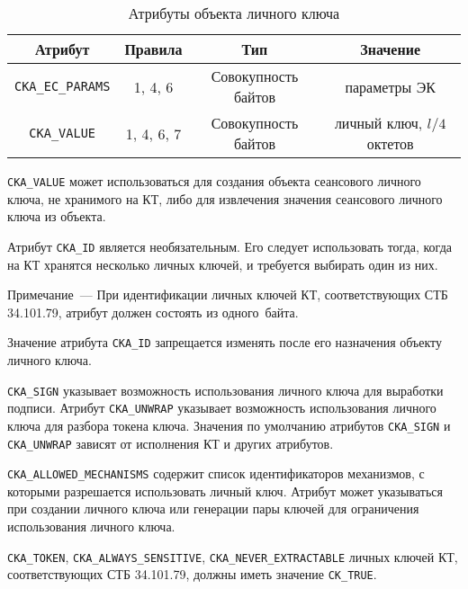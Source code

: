 \begin{table}[H]
\caption{Атрибуты объекта личного ключа}\label{Table.CRYPTOKI.EcPrivkeyAttrs}
\begin{tabular}{|c|c|c|c|}
\hline
Атрибут & Правила & Тип & Значение\\
\hline
\hline
\verb|CKA_EC_PARAMS| & 1, 4, 6 & Совокупность байтов &
параметры ЭК\\
\hline
\verb|CKA_VALUE| & 1, 4, 6, 7 & Совокупность байтов &
личный ключ, $l/4$ октетов\\
\hline
\end{tabular}
\end{table}

 \verb|CKA_VALUE| может использоваться для
создания объекта сеансового личного ключа, не хранимого на КТ, либо для извлечения значения сеансового личного ключа из объекта.

Атрибут \verb|CKA_ID| является необязательным. 
Его следует использовать тогда, когда на КТ хранятся 
несколько личных ключей, и требуется выбирать один из них.

\begin{note}
Примечание~---
При идентификации личных ключей КТ, соответствующих СТБ 34.101.79,
атрибут должен состоять из одного~байта.
\end{note}

Значение атрибута \verb|CKA_ID| запрещается изменять
после его назначения объекту личного ключа.

 \verb|CKA_SIGN| указывает возможность
использования личного ключа для выработки подписи.
Атрибут \verb|CKA_UNWRAP| указывает возможность
использования личного ключа для разбора токена ключа.
Значения по умолчанию атрибутов \verb|CKA_SIGN| и \verb|CKA_UNWRAP|
зависят от исполнения КТ и других атрибутов.

 \verb|CKA_ALLOWED_MECHANISMS| содержит список
идентификаторов механизмов, с которыми разрешается использовать
личный ключ. Атрибут может указываться при создании личного
ключа или генерации пары ключей для ограничения использования
личного ключа.

 \verb|CKA_TOKEN|, \verb|CKA_ALWAYS_SENSITIVE|, \verb|CKA_NEVER_EXTRACTABLE|
личных ключей КТ, соответствующих СТБ 34.101.79,
должны иметь значение \verb|CK_TRUE|.

